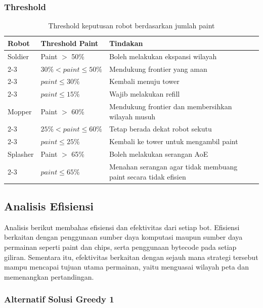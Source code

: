 \documentclass{article}
\renewcommand{\arraystretch}{1.3}
\begin{document}
\subsubsection{Threshold}
\begin{table}[H]
\centering
\renewcommand{\arraystretch}{1.2}
\begin{tabular}{|p{3cm}|p{4cm}|p{7cm}|}
\hline
\textbf{Robot} & \textbf{Threshold Paint} & \textbf{Tindakan} \\
\hline

Soldier & Paint $>$ 50\% & Boleh melakukan ekspansi wilayah \\
\cline{2-3}
 & $30\% < paint \leq 50\%$ & Mendukung frontier yang aman \\
\cline{2-3}
 & $paint \leq 30\%$ & Kembali menuju tower \\
\cline{2-3}
 & $paint \leq 15\%$ & Wajib melakukan refill \\
\hline

Mopper & Paint $>$ 60\% & Mendukung frontier dan membersihkan wilayah musuh \\
\cline{2-3}
 & $25\% < paint \leq 60\%$ & Tetap berada dekat robot sekutu \\
\cline{2-3}
 & $paint \leq 25\%$ & Kembali ke tower untuk mengambil paint \\
\hline

Splasher & Paint $>$ 65\% & Boleh melakukan serangan AoE \\
\cline{2-3}
 & $paint \leq 65\%$ & Menahan serangan agar tidak membuang paint secara tidak efisien \\
\hline

\end{tabular}
\caption{Threshold keputusan robot berdasarkan jumlah paint}
\end{table}


\subsection{Analisis Efisiensi}

Analisis berikut membahas efisiensi dan efektivitas dari setiap bot. Efisiensi berkaitan dengan
penggunaan sumber daya komputasi maupun sumber daya permainan seperti paint dan chips, serta
penggunaan bytecode pada setiap giliran. Sementara itu, efektivitas berkaitan dengan sejauh mana strategi
tersebut mampu mencapai tujuan utama permainan, yaitu menguasai wilayah peta dan memenangkan
pertandingan. 

\subsubsection{Alternatif Solusi Greedy 1}
\end{document}

